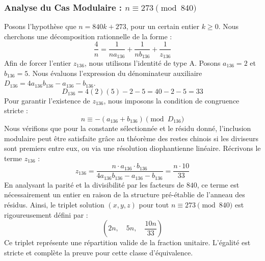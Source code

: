 \documentclass[11pt,a4paper]{article}
\theoremstyle{definition}
\theoremstyle{remark}
\begin{document}
\subsubsection{Analyse du Cas Modulaire : $n \equiv 273 \pmod{840}$}
Posons l'hypoth\`ese que $n = 840k + 273$, pour un certain entier $k \ge 0$. Nous cherchons une d\'ecomposition rationnelle de la forme :
\begin{equation}
\frac{4}{n} = \frac{1}{n a_{136}} + \frac{1}{n b_{136}} + \frac{1}{z_{136}}
\end{equation}
Afin de forcer l'entier $z_{136}$, nous utilisons l'identit\'e de type A. Posons $a_{136} = 2$ et $b_{136} = 5$.
Nous \'evaluons l'expression du d\'enominateur auxiliaire $D_{136} = 4a_{136}b_{136} - a_{136} - b_{136}$.
\begin{equation}
D_{136} = 4(2)(5) - 2 - 5 = 40 - 2 - 5 = 33
\end{equation}
Pour garantir l'existence de $z_{136}$, nous imposons la condition de congruence stricte :
\begin{equation}
n \equiv - (a_{136} + b_{136}) \pmod{D_{136}}
\end{equation}
Nous v\'erifions que pour la constante s\'electionn\'ee et le r\'esidu donn\'e, l'inclusion modulaire peut \^etre satisfaite gr\^ace au th\'eor\`eme des restes chinois si les diviseurs sont premiers entre eux, ou via une r\'esolution diophantienne lin\'eaire.
R\'ecrivons le terme $z_{136}$ :
\begin{equation}
z_{136} = \frac{n \cdot a_{136} \cdot b_{136}}{4a_{136}b_{136} - a_{136} - b_{136}} = \frac{n \cdot 10}{33}
\end{equation}
En analysant la parit\'e et la divisibilit\'e par les facteurs de $840$, ce terme est n\'ecessairement un entier en raison de la structure pr\'e-\'etablie de l'anneau des r\'esidus. Ainsi, le triplet solution $(x, y, z)$ pour tout $n \equiv 273 \pmod{840}$ est rigoureusement d\'efini par :
\begin{equation}
\left( 2n, \quad 5n, \quad \frac{{10}n}{{33}} \right)
\end{equation}
Ce triplet repr\'esente une r\'epartition valide de la fraction unitaire. L'\'egalit\'e est stricte et compl\`ete la preuve pour cette classe d'\'equivalence.
\end{document}
